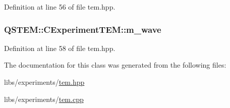 Definition at line 56 of file tem.\-hpp.

\hypertarget{class_q_s_t_e_m_1_1_c_experiment_t_e_m_ab0e428cafa2f5585a4e3db77c23310a0}{
\subsubsection[{m\-\_\-wave}]{ Q\-S\-T\-E\-M\-::\-C\-Experiment\-T\-E\-M\-::m\-\_\-wave\hspace{0.3cm}{\ttfamily [protected]}}}\label{class_q_s_t_e_m_1_1_c_experiment_t_e_m_ab0e428cafa2f5585a4e3db77c23310a0}


Definition at line 58 of file tem.\-hpp.



The documentation for this class was generated from the following files\-:\begin{DoxyCompactItemize}
\item 
libs/experiments/\hyperlink{tem_8hpp}{tem.\-hpp}\item 
libs/experiments/\hyperlink{tem_8cpp}{tem.\-cpp}\end{DoxyCompactItemize}
